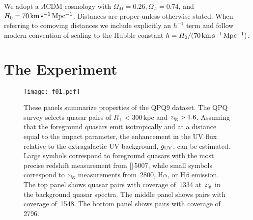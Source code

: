 \documentclass[iop]{emulateapj}
\begin{document}

We adopt a $\Lambda$CDM cosmology with $\Omega_M=0.26, \Omega_\Lambda=0.74$, and 
$H_0=70\,{\rm km\,s^{-1}\,Mpc^{-1}}$. Distances are proper unless otherwise stated. When referring 
to comoving distances we include explicitly an $h^{-1}$ term and follow modern convention of 
scaling to the Hubble constant $h = H_0/(70\,{\rm km\,s^{-1}\,Mpc^{-1}})$.

\section{The Experiment}
\label{sec:experiment}

%


\begin{figure}
\texttt{[image: f01.pdf]}
\caption{These panels summarize properties of the QPQ9 dataset. The QPQ survey selects 
quasar pairs of $R_\perp < 300$\,kpc and $z_{\rm fg}>1.6$. Assuming that the foreground quasars 
emit isotropically and at a distance equal to the impact parameter, the enhancement in the UV 
flux relative to the extragalactic UV background, $g_{\rm UV}$, can be estimated. Large 
symbols correspond to foreground quasars with the most precise redshift measurement from 
[]\,5007, while small symbols correspond to $z_{\rm fg}$ 
measurements from \,2800, H$\alpha$, or H$\beta$ emission. The top panel shows 
quasar pairs with coverage of \,1334 at $z_{\rm fg}$ in the background quasar spectra. 
The middle panel shows pairs with coverage of \,1548. The bottom panel shows 
pairs with coverage of \,2796. 
}
\label{fig:experiment}
\end{figure}
\end{document}
